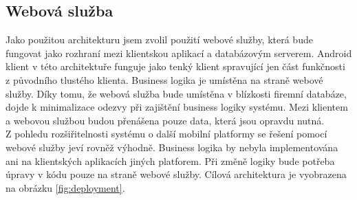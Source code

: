 \documentclass{diplomka}
\begin{document}
\subsection{Webová služba}
Jako použitou architekturu jsem zvolil použití webové služby, která bude fungovat jako rozhraní mezi klientskou aplikací a databázovým serverem. Android klient v této architektuře funguje jako tenký klient spravující jen část funkčnosti z původního tlustého klienta. Business logika je umístěna na straně webové služby. Díky tomu, že webová služba bude umístěna v blízkosti firemní databáze, dojde k minimalizace odezvy při zajištění business logiky systému. Mezi klientem a webovou službou budou přenášena pouze data, která jsou opravdu nutná. \\ \indent
Z pohledu rozšiřitelnosti systému o další mobilní platformy se řešení pomocí webové služby jeví rovněž výhodně. Business logika by nebyla implementována ani na klientských aplikacích jiných platforem. Při změně logiky bude potřeba úpravy v kódu pouze na straně webové služby. Cílová architektura je vyobrazena na obrázku \ref{fig:deployment}.

\newpage
\end{document}
